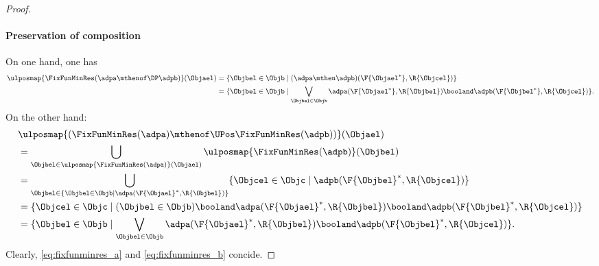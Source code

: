 \begin{proof}
    \paragraph*{Preservation of composition}
    On one hand, one has
    \begin{equation}
        \label{eq:fixfunminres_a}
        \begin{aligned}
            \ulposmap{\FixFunMinRes(\adpa\mthenof\DP \adpb)}(\Objael) & =\{ \Objbel\in \Objb\mid (\adpa\mthen \adpb)(\F{\Objael^*},\R{\Objcel})\}                                                        \\
                                                                      & =\{ \Objbel\in \Objb\mid \bigvee_{\Objbel \in \Objb}\adpa(\F{\Objael^*},\R{\Objbel})\booland \adpb(\F{\Objbel^*},\R{\Objcel})\}.
        \end{aligned}
    \end{equation}
    On the other hand:
    \begin{equation}
        \label{eq:fixfunminres_b}
        \begin{aligned}
             & \ulposmap{(\FixFunMinRes(\adpa)\mthenof\UPos \FixFunMinRes(\adpb))}(\Objael)                                                                    \\
             & =\bigcup_{\Objbel \in \ulposmap{\FixFunMinRes(\adpa)}(\Objael)}\ulposmap{\FixFunMinRes(\adpb)}(\Objbel)                                         \\
             & =\bigcup_{\Objbel \in \{ \Objbel \in \Objb \mid \adpa(\F{\Objael}^*,\R{\Objbel})\}} \{\Objcel \in \Objc \mid \adpb(\F{\Objbel}^*,\R{\Objcel})\} \\
             & =\{\Objcel\in \Objc \mid (\Objbel \in \Objb)\booland \adpa(\F{\Objael}^*,\R{\Objbel})\booland \adpb(\F{\Objbel}^*,\R{\Objcel})\}                \\
             & =\{ \Objbel\in \Objb\mid \bigvee_{\Objbel \in \Objb}\adpa(\F{\Objael}^*,\R{\Objbel})\booland \adpb(\F{\Objbel}^*,\R{\Objcel})\}.
        \end{aligned}
    \end{equation}
    Clearly, \cref{eq:fixfunminres_a} and \cref{eq:fixfunminres_b} concide.
\end{proof}

